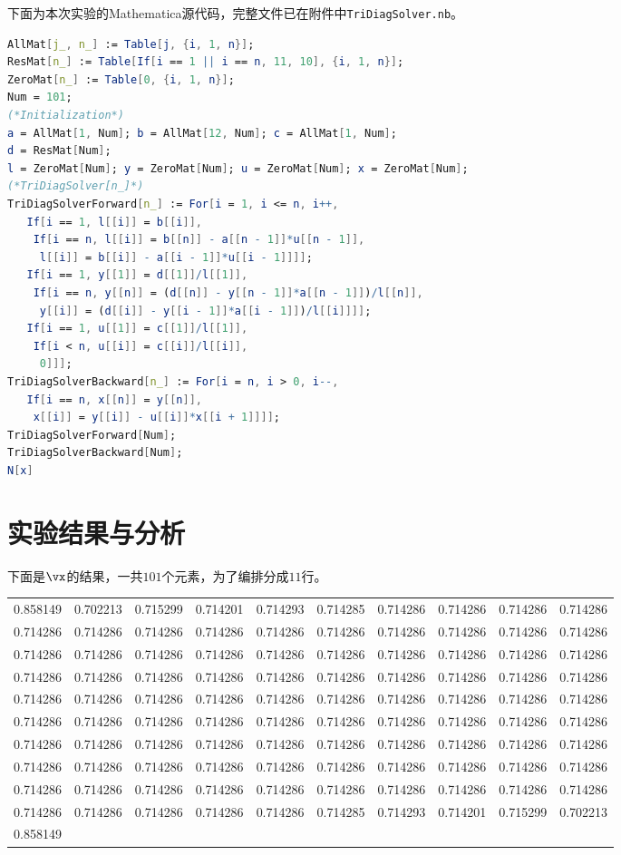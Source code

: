\documentclass[reportComp]{thesis}
\begin{document}
下面为本次实验的Mathematica源代码，完整文件已在附件中\verb'TriDiagSolver.nb'。
\begin{lstlisting}[language=mathematica]
AllMat[j_, n_] := Table[j, {i, 1, n}];
ResMat[n_] := Table[If[i == 1 || i == n, 11, 10], {i, 1, n}];
ZeroMat[n_] := Table[0, {i, 1, n}];
Num = 101;
(*Initialization*)
a = AllMat[1, Num]; b = AllMat[12, Num]; c = AllMat[1, Num];
d = ResMat[Num];
l = ZeroMat[Num]; y = ZeroMat[Num]; u = ZeroMat[Num]; x = ZeroMat[Num];
(*TriDiagSolver[n_]*)
TriDiagSolverForward[n_] := For[i = 1, i <= n, i++,
   If[i == 1, l[[i]] = b[[i]],
    If[i == n, l[[i]] = b[[n]] - a[[n - 1]]*u[[n - 1]],
     l[[i]] = b[[i]] - a[[i - 1]]*u[[i - 1]]]];
   If[i == 1, y[[1]] = d[[1]]/l[[1]],
    If[i == n, y[[n]] = (d[[n]] - y[[n - 1]]*a[[n - 1]])/l[[n]],
     y[[i]] = (d[[i]] - y[[i - 1]]*a[[i - 1]])/l[[i]]]];
   If[i == 1, u[[1]] = c[[1]]/l[[1]],
    If[i < n, u[[i]] = c[[i]]/l[[i]],
     0]]];
TriDiagSolverBackward[n_] := For[i = n, i > 0, i--,
   If[i == n, x[[n]] = y[[n]],
    x[[i]] = y[[i]] - u[[i]]*x[[i + 1]]]];
TriDiagSolverForward[Num];
TriDiagSolverBackward[Num];
N[x]
\end{lstlisting}

\section{实验结果与分析}
下面是$\vx$的结果，一共$101$个元素，为了编排分成$11$行。
{\xiaowu
\begin{center}
\begin{tabular}{cccccccccc}\hline\hline
0.858149 & 0.702213 & 0.715299 & 0.714201 & 0.714293 & 0.714285 & 0.714286 & 0.714286 & 0.714286 & 0.714286 \\
0.714286 & 0.714286 & 0.714286 & 0.714286 & 0.714286 & 0.714286 & 0.714286 & 0.714286 & 0.714286 & 0.714286 \\
0.714286 & 0.714286 & 0.714286 & 0.714286 & 0.714286 & 0.714286 & 0.714286 & 0.714286 & 0.714286 & 0.714286 \\
0.714286 & 0.714286 & 0.714286 & 0.714286 & 0.714286 & 0.714286 & 0.714286 & 0.714286 & 0.714286 & 0.714286 \\
0.714286 & 0.714286 & 0.714286 & 0.714286 & 0.714286 & 0.714286 & 0.714286 & 0.714286 & 0.714286 & 0.714286 \\
0.714286 & 0.714286 & 0.714286 & 0.714286 & 0.714286 & 0.714286 & 0.714286 & 0.714286 & 0.714286 & 0.714286 \\
0.714286 & 0.714286 & 0.714286 & 0.714286 & 0.714286 & 0.714286 & 0.714286 & 0.714286 & 0.714286 & 0.714286 \\
0.714286 & 0.714286 & 0.714286 & 0.714286 & 0.714286 & 0.714286 & 0.714286 & 0.714286 & 0.714286 & 0.714286 \\
0.714286 & 0.714286 & 0.714286 & 0.714286 & 0.714286 & 0.714286 & 0.714286 & 0.714286 & 0.714286 & 0.714286 \\
0.714286 & 0.714286 & 0.714286 & 0.714286 & 0.714286 & 0.714285 & 0.714293 & 0.714201 & 0.715299 & 0.702213 \\
0.858149\\\hline
\end{tabular}
\end{center}
}
\end{document}
